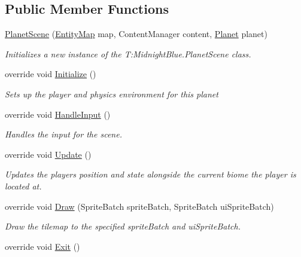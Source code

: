 \subsection*{Public Member Functions}
\begin{DoxyCompactItemize}
\item 
\hyperlink{class_midnight_blue_1_1_planet_scene_a50ee691836116a89ff549e519f895ba3}{Planet\+Scene} (\hyperlink{class_m_b2_d_1_1_entity_component_1_1_entity_map}{Entity\+Map} map, Content\+Manager content, \hyperlink{class_midnight_blue_1_1_planet}{Planet} planet)
\begin{DoxyCompactList}\small\item\em Initializes a new instance of the T\+:\+Midnight\+Blue.\+Planet\+Scene class. \end{DoxyCompactList}\item 
override void \hyperlink{class_midnight_blue_1_1_planet_scene_ac8b7e88283b22b87aa45f116b549e86f}{Initialize} ()
\begin{DoxyCompactList}\small\item\em Sets up the player and physics environment for this planet \end{DoxyCompactList}\item 
override void \hyperlink{class_midnight_blue_1_1_planet_scene_a6c84a639f27b9f7510b514969d47d1bd}{Handle\+Input} ()
\begin{DoxyCompactList}\small\item\em Handles the input for the scene. \end{DoxyCompactList}\item 
override void \hyperlink{class_midnight_blue_1_1_planet_scene_add0a85b4f754f026231aa7269259c65c}{Update} ()
\begin{DoxyCompactList}\small\item\em Updates the players position and state alongside the current biome the player is located at. \end{DoxyCompactList}\item 
override void \hyperlink{class_midnight_blue_1_1_planet_scene_af22a201631e5f8c606ec3f7463635977}{Draw} (Sprite\+Batch sprite\+Batch, Sprite\+Batch ui\+Sprite\+Batch)
\begin{DoxyCompactList}\small\item\em Draw the tilemap to the specified sprite\+Batch and ui\+Sprite\+Batch. \end{DoxyCompactList}\item 
override void \hyperlink{class_midnight_blue_1_1_planet_scene_af3aab90a13294493e1f2cd29b0fb60e6}{Exit} ()

\end{DoxyCompactItemize}
